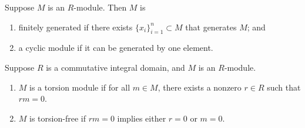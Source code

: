 \begin{definition}
    Suppose \(M\) is an \(R\)-module. Then \(M\) is 
    \begin{enumerate}[label={(\roman*)}, itemsep=0mm]
        \item finitely generated if there exists \({\{x_i\}}_{i=1}^n \subset M\) that generates \(M\); and
        \item a cyclic module if it can be generated by one element.
    \end{enumerate}
\end{definition}
\begin{definition}
    Suppose \(R\) is a commutative integral domain,
    and \(M\) is an \(R\)-module.
    \begin{enumerate}[label={(\roman*)}, itemsep=0mm]
        \item \(M\) is a torsion module if for all \(m \in M\),
            there exists a nonzero \(r \in R\) such that \(rm = 0\).
        \item \(M\) is torsion-free if \(rm = 0\) implies either \(r = 0\) or \(m = 0\).
    \end{enumerate}
\end{definition}

